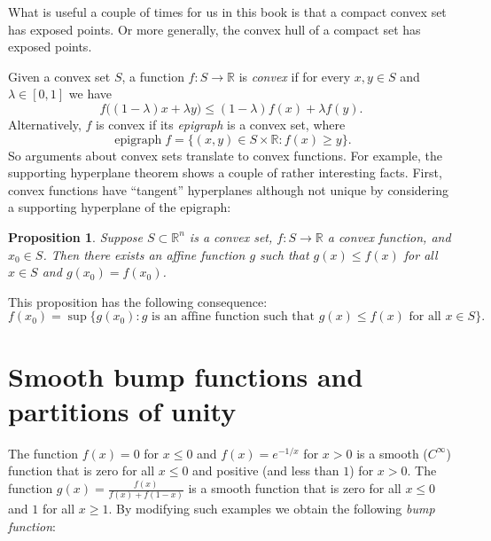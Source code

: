 \documentclass[12pt,openany]{book}
\newcommand{\R}{{\mathbb{R}}}
\newcommand{\myindex}[1]{#1\index{#1}}
\theoremstyle{plain}
\newtheorem{prop}[thm]{Proposition}
\theoremstyle{remark}
\theoremstyle{definition}
\theoremstyle{exercise}
\theoremstyle{example}
\begin{document}
What is useful a couple of times for us in this book is that a compact
convex set has exposed points.  Or more generally, the convex hull of a
compact set has exposed points.

Given a convex set $S$, a function $f \colon S \to \R$ is
\emph{convex} if
for every $x,y \in S$ and $\lambda \in [0,1]$ we have
\begin{equation*}
f\bigl((1-\lambda) x + \lambda y\bigr) \leq
(1-\lambda) f(x) + \lambda f(y) .
\end{equation*}
Alternatively, $f$ is convex if its \emph{\myindex{epigraph}}
is a convex set, where
\begin{equation*}
\operatorname{epigraph} f
= \bigl\{ (x,y) \in S \times \R : f(x) \geq y \bigr\} .
\end{equation*}
So arguments about convex sets translate to convex functions.
For example,
the supporting hyperplane theorem shows a couple of rather interesting
facts.  First, convex functions have ``tangent'' hyperplanes although not
unique by considering a supporting hyperplane of the epigraph:

\begin{prop}
Suppose $S \subset \R^n$ is a convex set, $f \colon S \to \R$ a
convex function, and $x_0 \in S$.  Then there exists an affine function
$g$ such that $g(x) \leq f(x)$ for all $x \in S$ and $g(x_0) = f(x_0)$.
\end{prop}

This proposition has the following consequence:
\begin{equation*}
f(x_0) = \sup \bigl\{ g(x_0) : g \text{ is an affine function such that } g(x) \leq
f(x) \text{ for all } x \in S \bigr\} .
\end{equation*}


\section{Smooth bump functions and partitions of unity} \label{apsec:partofunity}

The function $f(x) = 0$ for $x \leq 0$ and $f(x) = e^{-1/x}$ for $x > 0$ is
a smooth ($C^\infty$) function that is zero for all $x \leq 0$ and positive
(and less than $1$)
for $x > 0$.  The function $g(x) = \frac{f(x)}{f(x)+f(1-x)}$ is a smooth
function that is zero for all $x \leq 0$ and $1$ for all $x \geq 1$.
By modifying such examples we obtain the following
\emph{\myindex{bump function}}:
\end{document}
